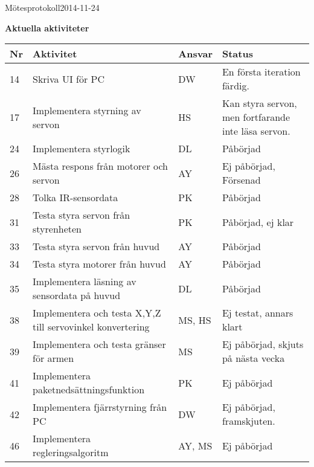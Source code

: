 \documentclass[titlepage, a4paper]{article}
\begin{document}
\begin{projektmote}{Mötesprotokoll}{2014-11-24}
\end{projektmote}

\newpage
\textbf{\Large Aktuella aktiviteter}
\begin{center}
\begin{tabularx}{\textwidth}{| p{4mm} | X | p{13.5mm} | X |}
	\hline
	\textbf{Nr} & \textbf{Aktivitet} & \textbf{Ansvar} & \textbf{Status} \\\hline
	{14} & {Skriva UI för PC} & {DW} & {En första iteration färdig.} \\\hline
	{17} & {Implementera styrning av servon} & {HS} & {Kan styra servon, men fortfarande inte läsa servon.} \\\hline
	{24} & {Implementera styrlogik} & {DL} & {Påbörjad} \\\hline
	{26} & {Mästa respons från motorer och servon} & {AY} & {Ej påbörjad, Försenad} \\\hline
	{28} & {Tolka IR-sensordata} & {PK} & {Påbörjad} \\\hline
	{31} & {Testa styra servon från styrenheten} & {PK} & {Påbörjad, ej klar} \\\hline
	{33} & {Testa styra servon från huvud} & {AY} & {Påbörjad} \\\hline
	{34} & {Testa styra motorer från huvud} & {AY} & {Påbörjad} \\\hline
	{35} & {Implementera läsning av sensordata på huvud} & {DL} & {Påbörjad} \\\hline
	{38} & {Implementera och testa X,Y,Z  till servovinkel konvertering} & {MS, HS} & {Ej testat, annars klart} \\\hline
	{39} & {Implementera och testa gränser för armen} & {MS} & {Ej påbörjad, skjuts på nästa vecka} \\\hline
	{41} & {Implementera paketnedsättningsfunktion} & {PK} & {Ej påbörjad} \\\hline
	{42} & {Implementera fjärrstyrning från PC} & {DW} & {Ej påbörjad, framskjuten.} \\\hline
	{46} & {Implementera regleringsalgoritm} & {AY, MS} & {Ej påbörjad} \\\hline
\end{tabularx}
\end{center}
\end{document}
